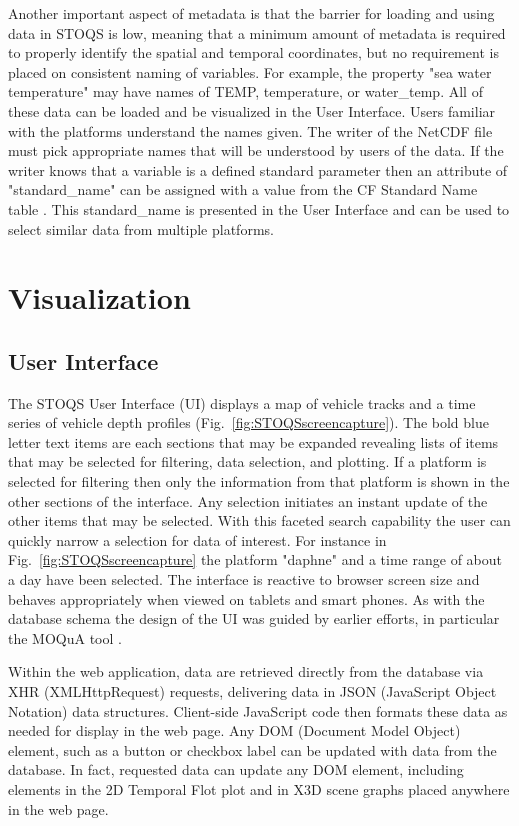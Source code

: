 \documentclass[conference]{IEEEtran}
\begin{document}
Another important aspect of metadata is that the barrier for loading and using data in STOQS is low, meaning that a minimum amount of metadata is required to properly identify the spatial and temporal coordinates, but no requirement is placed on consistent naming of variables. For example, the property "sea water temperature" may have names of TEMP, temperature, or water\_temp. All of these data can be loaded and be visualized in the User Interface. Users familiar with the platforms understand the names given. The writer of the NetCDF file must pick appropriate names that will be understood by users of the data. If the writer knows that a variable is a defined standard parameter then an attribute of "standard\_name" can be assigned with a value from the CF Standard Name table \cite{CFSN}. This standard\_name is presented in the User Interface and can be used to select similar data from multiple platforms.


\section{Visualization}

\subsection{User Interface}

The STOQS User Interface (UI) displays a map of vehicle tracks and a time series of vehicle depth profiles (Fig.~\ref{fig:STOQSscreencapture}). The bold blue letter text items are each sections that may be expanded revealing lists of items that may be selected for filtering, data selection, and plotting. If a platform is selected for filtering then only the information from that platform is shown in the other sections of the interface. Any selection initiates an instant update of the other items that may be selected. With this faceted search capability the user can quickly narrow a selection for data of interest. For instance in Fig.~\ref{fig:STOQSscreencapture} the platform "daphne"  and a time range of about a day have been selected. The interface is reactive to browser screen size and behaves appropriately when viewed on tablets and smart phones. As with the database schema the design of the UI was guided by earlier efforts, in particular the MOQuA tool \cite{godin05}.

Within the web application, data are retrieved directly from the database via XHR (XMLHttpRequest) requests, delivering data in JSON (JavaScript Object Notation) data structures. Client-side JavaScript code then formats these data as needed for display in the web page. Any DOM (Document Model Object) element, such as a button or checkbox label can be updated with data from the database. In fact, requested data can update any DOM element, including elements in the 2D Temporal Flot plot and in X3D scene graphs placed anywhere in the web page.
\end{document}
